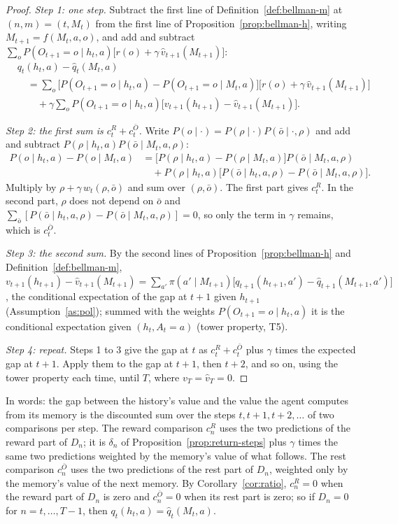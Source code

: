 \documentclass{article}
\theoremstyle{definition}
\theoremstyle{remark}
\newcommand{\Ob}{\bar O}
\begin{document}
\begin{proof}
\emph{Step 1: one step.} Subtract the first line of Definition~\ref{def:bellman-m} at $(n,m)=(t,M_t)$ from the first line of Proposition~\ref{prop:bellman-h}, writing $M_{t+1}=f(M_t,a,o)$, and add and subtract $\sum_oP(O_{t+1}=o\mid h_t,a)\big[r(o)+\gamma\,\hat v_{t+1}(M_{t+1})\big]$:
\begin{align*}
&q_t(h_t,a)-\hat q_t(M_t,a)\\
&\quad=\sum_o\big[P(O_{t+1}=o\mid h_t,a)-P(O_{t+1}=o\mid M_t,a)\big]\big[r(o)+\gamma\,\hat v_{t+1}(M_{t+1})\big]\\
&\qquad+\gamma\sum_oP(O_{t+1}=o\mid h_t,a)\big[v_{t+1}(h_{t+1})-\hat v_{t+1}(M_{t+1})\big].
\end{align*}

\emph{Step 2: the first sum is $c^R_t+c^{\Ob}_t$.} Write $P(o\mid\cdot)=P(\rho\mid\cdot)P(\bar o\mid\cdot,\rho)$ and add and subtract $P(\rho\mid h_t,a)P(\bar o\mid M_t,a,\rho)$:
\begin{align*}
P(o\mid h_t,a)-P(o\mid M_t,a)&=\big[P(\rho\mid h_t,a)-P(\rho\mid M_t,a)\big]P(\bar o\mid M_t,a,\rho)\\
&\quad+P(\rho\mid h_t,a)\big[P(\bar o\mid h_t,a,\rho)-P(\bar o\mid M_t,a,\rho)\big].
\end{align*}
Multiply by $\rho+\gamma\,w_t(\rho,\bar o)$ and sum over $(\rho,\bar o)$. The first part gives $c^R_t$. In the second part, $\rho$ does not depend on $\bar o$ and $\sum_{\bar o}[P(\bar o\mid h_t,a,\rho)-P(\bar o\mid M_t,a,\rho)]=0$, so only the term in $\gamma$ remains, which is $c^{\Ob}_t$.

\emph{Step 3: the second sum.} By the second lines of Proposition~\ref{prop:bellman-h} and Definition~\ref{def:bellman-m}, $v_{t+1}(h_{t+1})-\hat v_{t+1}(M_{t+1})=\sum_{a'}\pi(a'\mid M_{t+1})\big[q_{t+1}(h_{t+1},a')-\hat q_{t+1}(M_{t+1},a')\big]$, the conditional expectation of the gap at $t+1$ given $h_{t+1}$ (Assumption~\ref{as:pol}); summed with the weights $P(O_{t+1}=o\mid h_t,a)$ it is the conditional expectation given $(h_t,A_t=a)$ (tower property, T5).

\emph{Step 4: repeat.} Steps 1 to 3 give the gap at $t$ as $c^R_t+c^{\Ob}_t$ plus $\gamma$ times the expected gap at $t+1$. Apply them to the gap at $t+1$, then $t+2$, and so on, using the tower property each time, until $T$, where $v_T=\hat v_T=0$.
\end{proof}

In words: the gap between the history's value and the value the agent computes from its memory is the discounted sum over the steps $t,t+1,t+2,\dots$ of two comparisons per step. The reward comparison $c^R_n$ uses the two predictions of the reward part of $D_n$; it is $\delta_n$ of Proposition~\ref{prop:return-steps} plus $\gamma$ times the same two predictions weighted by the memory's value of what follows. The rest comparison $c^{\Ob}_n$ uses the two predictions of the rest part of $D_n$, weighted only by the memory's value of the next memory. By Corollary~\ref{cor:ratio}, $c^R_n=0$ when the reward part of $D_n$ is zero and $c^{\Ob}_n=0$ when its rest part is zero; so if $D_n=0$ for $n=t,\dots,T-1$, then $q_t(h_t,a)=\hat q_t(M_t,a)$.
\end{document}

